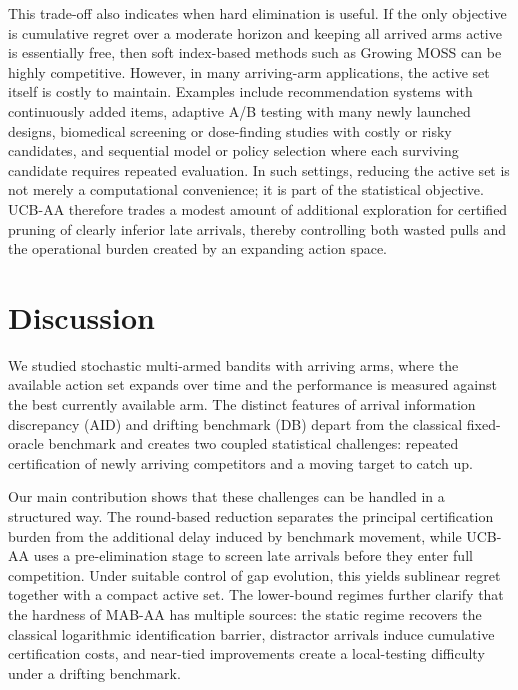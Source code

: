 \documentclass[11pt]{article}
\begin{document}
This trade-off also indicates when hard elimination is useful. If the only objective is cumulative
regret over a moderate horizon and keeping all arrived arms active is essentially free, then soft
index-based methods such as Growing MOSS can be highly competitive. However, in many arriving-arm
applications, the active set itself is costly to maintain. Examples include recommendation systems
with continuously added items, adaptive A/B testing with many newly launched designs, biomedical
screening or dose-finding studies with costly or risky candidates, and sequential model or policy
selection where each surviving candidate requires repeated evaluation. In such settings, reducing
the active set is not merely a computational convenience; it is part of the statistical objective.
UCB-AA therefore trades a modest amount of additional exploration for certified pruning of clearly
inferior late arrivals, thereby controlling both wasted pulls and the operational burden created
by an expanding action space.



\section{Discussion}\label{sec:Discussion}


We studied stochastic multi-armed bandits with arriving arms, where the available action
set expands over time and the performance is measured against the best currently available arm. The distinct features of arrival information discrepancy (AID) and drifting benchmark (DB) depart from the classical fixed-oracle benchmark and creates two
coupled statistical challenges: repeated certification of newly arriving competitors and a moving target to catch up.

Our main contribution shows that these challenges can be handled in a structured way. The round-based reduction separates the principal certification burden from the additional delay induced by benchmark movement, while UCB-AA uses a pre-elimination stage to screen late arrivals before they enter full competition. Under suitable control of gap evolution, this yields sublinear regret together with a compact active set. The lower-bound regimes further clarify that the hardness of MAB-AA has multiple sources: the static regime recovers the classical logarithmic identification barrier, distractor arrivals induce cumulative certification costs, and near-tied improvements create a local-testing difficulty under a drifting benchmark.
\end{document}
